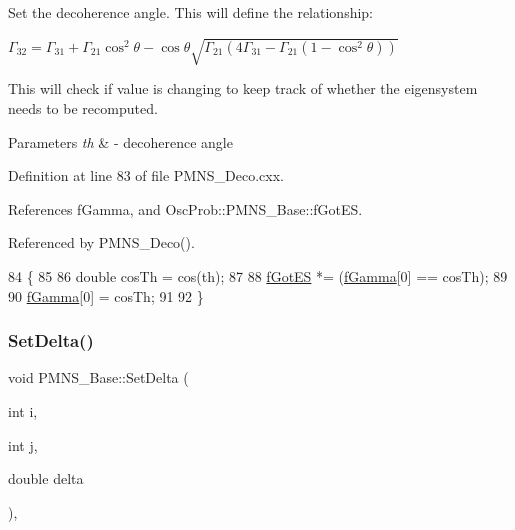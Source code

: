 Set the decoherence angle. This will define the relationship\+:

$ \Gamma_{32} = \Gamma_{31} + \Gamma_{21} \cos^2\theta - \cos\theta \sqrt{\Gamma_{21} (4\Gamma_{31} - \Gamma_{21} (1 - \cos^2\theta))} $

This will check if value is changing to keep track of whether the eigensystem needs to be recomputed.


\begin{DoxyParams}{Parameters}
{\em th} & -\/ decoherence angle \\
\hline
\end{DoxyParams}


Definition at line 83 of file P\+M\+N\+S\+\_\+\+Deco.\+cxx.



References f\+Gamma, and Osc\+Prob\+::\+P\+M\+N\+S\+\_\+\+Base\+::f\+Got\+ES.



Referenced by P\+M\+N\+S\+\_\+\+Deco().


\begin{DoxyCode}
84 \{
85 
86   \textcolor{keywordtype}{double} cosTh = cos(th);
87 
88   \hyperlink{classOscProb_1_1PMNS__Base_a6dc5cd010d2d70b2324745b4e53e9839}{fGotES} *= (\hyperlink{classOscProb_1_1PMNS__Deco_ae2f30ac9f8b25344959f1698616d337a}{fGamma}[0] == cosTh);
89 
90   \hyperlink{classOscProb_1_1PMNS__Deco_ae2f30ac9f8b25344959f1698616d337a}{fGamma}[0] = cosTh;
91   
92 \}
\end{DoxyCode}
\mbox{\label{classOscProb_1_1PMNS__Base_a4bef78cfcfc4e70b4ce79cdb8862c0a3}} 
\subsubsection{\texorpdfstring{Set\+Delta()}{SetDelta()}}
{\footnotesize\ttfamily void P\+M\+N\+S\+\_\+\+Base\+::\+Set\+Delta (\begin{DoxyParamCaption}\item[{int}]{i,  }\item[{int}]{j,  }\item[{double}]{delta }\end{DoxyParamCaption})\hspace{0.3cm}{\ttfamily [virtual]}, {\ttfamily [inherited]}}

